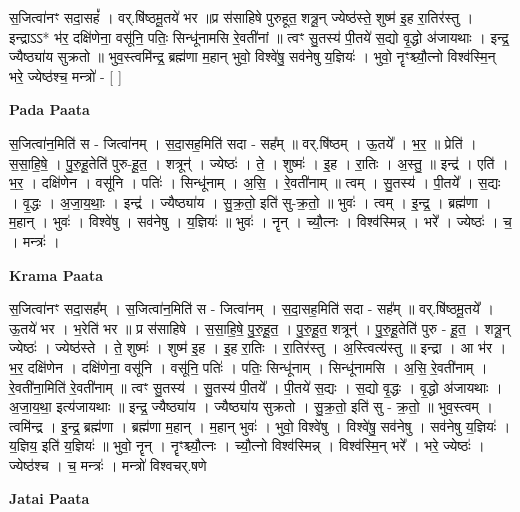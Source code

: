 \documentclass[17pt]{extarticle}
\begin{document}
स॒जित्वा॑नꣳ सदा॒सहं᳚ । वर्.षि॑ष्ठमू॒तये॑ भर ॥प्र स॑साहिषे पुरुहूत॒ शत्रू॒न् ज्येष्ठ॑स्ते॒ शुष्म॑ इ॒ह रा॒तिर॑स्तु । इन्द्राऽऽ* भ॑र॒ दक्षि॑णेना॒ वसू॑नि॒ पतिः॒ सिन्धू॑नामसि रे॒वती॑नां ॥ त्वꣳ सु॒तस्य॑ पी॒तये॑ स॒द्यो वृ॒द्धो अ॑जायथाः । इन्द्र॒ ज्यैष्ठ्या॑य सुक्रतो ॥ भुव॒स्त्वमि॑न्द्र॒ ब्रह्म॑णा म॒हान् भुवो॒ विश्वे॑षु॒ सव॑नेषु य॒ज्ञियः॑ । भुवो॒ नॄꣳश्च्यौ॒त्नो विश्व॑स्मि॒न् भरे॒ ज्येष्ठ॑श्च॒ मन्त्रो॑ - [  ] \newline

\textbf{Pada Paata} \newline

स॒जित्वा॑न॒मिति॑ स - जित्वा॑नम् । स॒दा॒सह॒मिति॑ सदा - सह᳚म् ॥ वर्.षि॑ष्ठम् । ऊ॒तये᳚ । भ॒र॒ ॥ प्रेति॑ । स॒सा॒हि॒षे॒ । पु॒रु॒हू॒तेति॑ पुरु-हू॒त॒ । शत्रून्॑ । ज्येष्ठः॑ । ते॒ । शुष्मः॑ । इ॒ह । रा॒तिः । अ॒स्तु॒ ॥ इन्द्र॑ । एति॑ । भ॒र॒ । दक्षि॑णेन । वसू॑नि । पतिः॑ । सिन्धू॑नाम् । अ॒सि॒ । रे॒वती॑नाम् ॥ त्वम् । सु॒तस्य॑ । पी॒तये᳚ । स॒द्यः । वृ॒द्धः । अ॒जा॒य॒थाः॒ । इन्द्र॑ । ज्यैष्ठ्या॑य । सु॒क्र॒तो॒ इति॑ सु-क्र॒तो॒ ॥ भुवः॑ । त्वम् । इ॒न्द्र॒ । ब्रह्म॑णा । म॒हान् । भुवः॑ । विश्वे॑षु । सव॑नेषु । य॒ज्ञियः॑ ॥ भुवः॑ । नॄन् । च्यौ॒त्नः । विश्व॑स्मिन्न् । भरे᳚ । ज्येष्ठः॑ । च॒ । मन्त्रः॑ ।  \newline


\textbf{Krama Paata} \newline

स॒जित्वा॑नꣳ सदा॒सह᳚म् । स॒जित्वा॑न॒मिति॑ स - जित्वा॑नम् । स॒दा॒सह॒मिति॑ सदा - सह᳚म् ॥ वर्.षि॑ष्ठमू॒तये᳚ । ऊ॒तये॑ भर । भ॒रेति॑ भर ॥ प्र स॑साहिषे । स॒सा॒हि॒षे॒ पु॒रु॒हू॒त॒ । पु॒रु॒हू॒त॒ शत्रून्॑ । पु॒रु॒हू॒तेति॑ पुरु - हू॒त॒ । शत्रू॒न् ज्येष्ठः॑ । ज्येष्ठ॑स्ते । ते॒ शुष्मः॑ । शुष्म॑ इ॒ह । इ॒ह रा॒तिः । रा॒तिर॑स्तु । अ॒स्त्वित्य॑स्तु ॥ इन्द्रा । आ भ॑र । भ॒र॒ दक्षि॑णेन । दक्षि॑णेना॒ वसू॑नि । वसू॑नि॒ पतिः॑ । पतिः॒ सिन्धू॑नाम् । सिन्धू॑नामसि । अ॒सि॒ रे॒वती॑नाम् । रे॒वती॑ना॒मिति॑ रे॒वती॑नाम् ॥ त्वꣳ सु॒तस्य॑ । सु॒तस्य॑ पी॒तये᳚ । पी॒तये॑ स॒द्यः । स॒द्यो वृ॒द्धः । वृ॒द्धो अ॑जायथाः । अ॒जा॒य॒था॒ इत्य॑जायथाः ॥  इन्द्र॒ ज्यैष्ठ्या॑य । ज्यैष्ठ्या॑य सुक्रतो । सु॒क्र॒तो॒ इति॑ सु - क्र॒तो॒ ॥ भुव॒स्त्वम् । त्वमि॑न्द्र । इ॒न्द्र॒ ब्रह्म॑णा । ब्रह्म॑णा म॒हान् । म॒हान् भुवः॑ । भुवो॒ विश्वे॑षु । विश्वे॑षु॒ सव॑नेषु । सव॑नेषु य॒ज्ञियः॑ । य॒ज्ञिय॒ इति॑ य॒ज्ञियः॑ ॥ भुवो॒ नॄन् । नॄꣳश्च्यौ॒त्नः । च्यौ॒त्नो विश्व॑स्मिन्न् । विश्व॑स्मि॒न् भरे᳚ । भरे॒ ज्येष्ठः॑ । ज्येष्ठ॑श्च । च॒ मन्त्रः॑ । मन्त्रो॑ विश्वचर्.षणे \newline

\textbf{Jatai Paata} \newline
\end{document}
